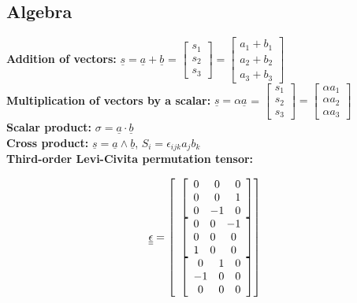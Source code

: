 \subsection*{Algebra}
\smallskip
\textbf{Addition of vectors:} $\underline{s} = \underline{a} + \underline{b}$ = $\left[\begin{smallmatrix} s_{1} \\ s_{2} \\ s_{3} \end{smallmatrix}\right] = \left[\begin{smallmatrix} a_1 + b_1 \\ a_2 + b_2 \\ a_3 + b_3 \end{smallmatrix}\right]$ \\
\textbf{Multiplication of vectors by a scalar:} $\underline{s} = \alpha \underline{a}$ = $\left[\begin{smallmatrix} s_{1} \\ s_{2} \\ s_{3} \end{smallmatrix}\right] = \left[\begin{smallmatrix} \alpha a_1 \\ \alpha a_2 \\ \alpha a_3 \end{smallmatrix}\right]$ \\
\textbf{Scalar product:} $ \sigma = \underline{a} \cdot \underline{b}$ \\
\textbf{Cross product:} $ \underline{s} = \underline{a} \wedge \underline{b}$, $S_{i} = \epsilon_{ijk} a_j b_k$ \\
\textbf{Third-order Levi-Civita permutation tensor:}


\[ \underline{\underline{\epsilon}} =
\left[ 
\begin{array}{c@{}}
 \left[\begin{array}{ccc}
         0 & 0 & 0 \\
         0 & 0 & 1 \\
         0 & -1 & 0 \\
  \end{array}\right] \\
   \left[\begin{array}{ccc}
         0 & 0 & -1 \\
         0 & 0 & 0 \\
         1 & 0 & 0 \\
  \end{array}\right] \\
 \left[\begin{array}{ccc}
         0 & 1 & 0 \\
         -1 & 0 & 0 \\
         0 & 0 & 0 \\
  \end{array}\right] \\
\end{array}\right]
\]

